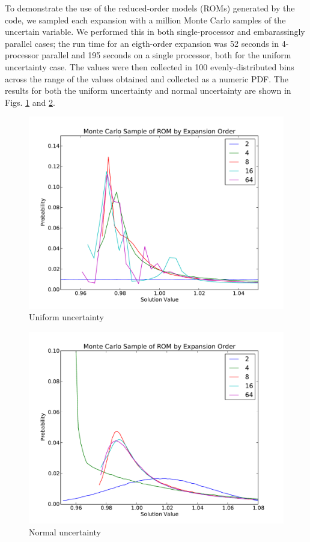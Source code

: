 To demonstrate the use of the reduced-order models (ROMs) generated by the code, we sampled each expansion with a million Monte Carlo samples of the uncertain variable.  We performed this in both single-processor and embarassingly parallel cases; the run time for an eigth-order expansion was 52 seconds in 4-processor parallel and 195 seconds on a single processor, both for the uniform uncertainty case.  The values were then collected in 100 evenly-distributed bins across the range of the values obtained and collected as a numeric PDF.  The results for both the uniform uncertainty and normal uncertainty are shown in Figs. \ref{diff_unipdfs} and \ref{diff_normpdfs}.


\begin{figure}[h!]
\centering
\includegraphics[width=0.7\linewidth]{./graphics/diff_romsample}
\caption{Uniform uncertainty}
\label{diff_unipdfs}
\end{figure}
\begin{figure}
\centering
\includegraphics[width=0.7\linewidth]{./graphics/diff_normrom}
\caption{Normal uncertainty}
\label{diff_normpdfs}
\end{figure}
